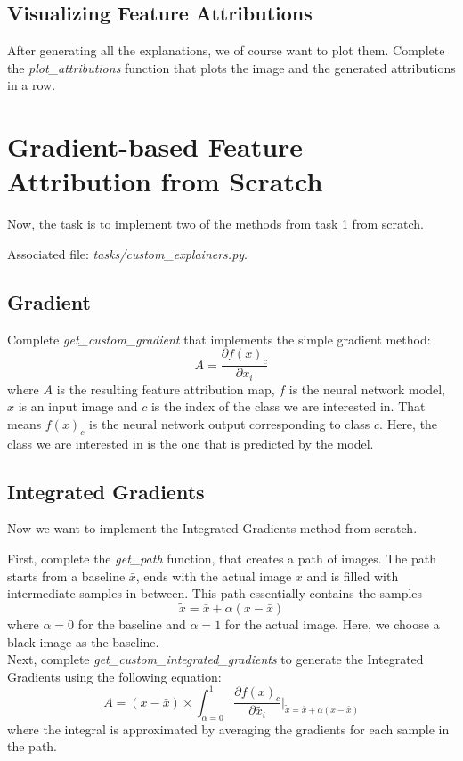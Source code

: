 \documentclass[a4paper]{article}
\begin{document}
\subsection{Visualizing Feature Attributions}
After generating all the explanations, we of course want to plot them.
Complete the \textit{plot\_attributions} function that plots the image and the generated attributions in a row.


\section{Gradient-based Feature Attribution from Scratch}
Now, the task is to implement two of the methods from task 1 from scratch.

\noindent Associated file: \textit{tasks/custom\_explainers.py}.

\subsection{Gradient}
Complete \textit{get\_custom\_gradient} that implements the simple gradient method:
\begin{equation}
    A = \frac{\partial f(x)_c}{\partial x_i}
\end{equation}
where $A$ is the resulting feature attribution map, $f$ is the neural network model, $x$ is an input image and $c$ is the index of the class we are interested in.
That means $f(x)_c$ is the neural network output corresponding to class $c$. Here, the class we are interested in is the one that is predicted by the model.


\subsection{Integrated Gradients}
Now we want to implement the Integrated Gradients method from scratch.

First, complete the \textit{get\_path} function, that creates a path of images.
The path starts from a baseline $\bar{x}$, ends with the actual image $x$ and is filled with intermediate samples in between.
This path essentially contains the samples
\begin{equation}
    \tilde{x} = \bar{x} + \alpha(x - \bar{x})
\end{equation}
where $\alpha=0$ for the baseline and $\alpha=1$ for the actual image.
Here, we choose a black image as the baseline.\\

Next, complete \textit{get\_custom\_integrated\_gradients} to generate the Integrated Gradients using the following equation:
\begin{equation}
    A = (x - \bar{x}) \times \int_{\alpha=0}^{1} \frac{\partial f(x)_c}{\partial \tilde{x_i}}\Bigg\rvert_{\tilde{x} = \bar{x} + \alpha(x - \bar{x})}
\end{equation}
where the integral is approximated by averaging the gradients for each sample in the path.
\end{document}
